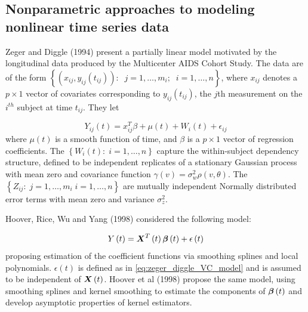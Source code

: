 \documentclass[12pt]{article}
\newcommand{\bfbeta}{\mbox{\boldmath $\beta$}}
\newcommand{\bfX}{\mbox{\boldmath $X$}}
\begin{document}
\subsection{Nonparametric approaches to modeling nonlinear time series data}

Zeger and Diggle (1994) present a partially linear model motivated by the longitudinal data produced by the Multicenter AIDS Cohort Study. The data are of the form $\left\{ \left(x_{ij},y_{ij}\left(t_{ij}\right)\right): \;\; j=1,\dots,m_i;\;\;i=1,\dots,n \right\}$, where $x_{ij}$ denotes a $p \times 1$ vector of covariates corresponding to $y_{ij}\left(t_{ij}\right)$, the $j$th measurement on the $i^{th}$ subject at time $t_{ij}$. They let 

\begin{equation} \label{eq:zeger_diggle_VC_model}
Y_{ij}\left(t\right) =  x_{ij}^T\beta + \mu\left(t\right) + W_i\left(t\right) + \epsilon_{ij}
\end{equation}
\noindent
where $\mu\left(t\right)$ is a smooth function of time, and $\beta$ is a $p \times 1$ vector of regression coefficients. The $\left\{ W_i\left(t\right):\;i=1,\dots,n \right\}$ capture the within-subject dependency structure, defined to be independent replicates of a stationary Gaussian process with mean zero and covariance function $\gamma\left(v\right) = \sigma_w^2\rho\left(v, \theta \right)$. The $\left\{ Z_{ij}:\;j=1,\dots,m_i\;i=1,\dots,n \right\}$ are mutually independent Normally distributed error terms with mean zero and variance $\sigma_z^2$.

Hoover, Rice, Wu and Yang (1998) considered the following model:

\begin{equation} \label{eq:hoover_rice_wu_VC_model}
Y\left(t\right) =  \bfX^T\left(t\right)\bfbeta \left(t\right) + \epsilon\left(t\right) 
\end{equation}
\noindent
proposing estimation of the coefficient functions via smoothing splines and local polynomials. $\epsilon\left(t\right)$ is defined as in \ref{eq:zeger_diggle_VC_model} and is assumed to be independent of $\bfX\left(t\right)$. Hoover et al (1998) propose the same model, using smoothing splines and kernel smoothing to estimate  the components of $\bfbeta\left(t\right)$ and develop asymptotic properties of kernel estimators. 
\end{document}
